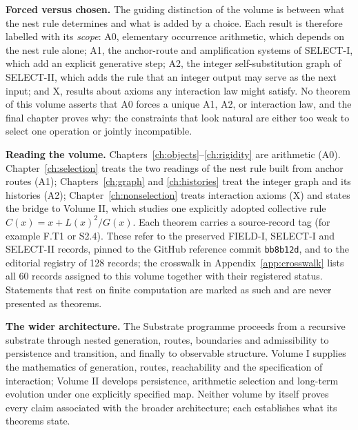 \documentclass[11pt,oneside,openany]{book}
\theoremstyle{definition}
\theoremstyle{remark}
\begin{document}
\textbf{Forced versus chosen.} The guiding distinction of the volume is between what the nest rule determines and what is added by a choice. Each result is therefore labelled with its \emph{scope}: \textsf{A0}, elementary occurrence arithmetic, which depends on the nest rule alone; \textsf{A1}, the anchor-route and amplification systems of SELECT-I, which add an explicit generative step; \textsf{A2}, the integer self-substitution graph of SELECT-II, which adds the rule that an integer output may serve as the next input; and \textsf{X}, results about axioms any interaction law might satisfy. No theorem of this volume asserts that \textsf{A0} forces a unique \textsf{A1}, \textsf{A2}, or interaction law, and the final chapter proves why: the constraints that look natural are either too weak to select one operation or jointly incompatible.

\textbf{Reading the volume.} Chapters~\ref{ch:objects}--\ref{ch:rigidity} are arithmetic (\textsf{A0}). Chapter~\ref{ch:selection} treats the two readings of the nest rule built from anchor routes (\textsf{A1}); Chapters~\ref{ch:graph} and \ref{ch:histories} treat the integer graph and its histories (\textsf{A2}); Chapter~\ref{ch:nonselection} treats interaction axioms (\textsf{X}) and states the bridge to Volume II, which studies one explicitly adopted collective rule \(C(x)=x+L(x)^2/G(x)\). Each theorem carries a source-record tag (for example F.T1 or S2.4). These refer to the preserved FIELD-I, SELECT-I and SELECT-II records, pinned to the GitHub reference commit \texttt{bb8b12d}, and to the editorial registry of 128 records; the crosswalk in Appendix~\ref{app:crosswalk} lists all 60 records assigned to this volume together with their registered status. Statements that rest on finite computation are marked as such and are never presented as theorems.

\textbf{The wider architecture.} The Substrate programme proceeds from a recursive substrate through nested generation, routes, boundaries and admissibility to persistence and transition, and finally to observable structure. Volume I supplies the mathematics of generation, routes, reachability and the specification of interaction; Volume II develops persistence, arithmetic selection and long-term evolution under one explicitly specified map. Neither volume by itself proves every claim associated with the broader architecture; each establishes what its theorems state.
\end{document}
